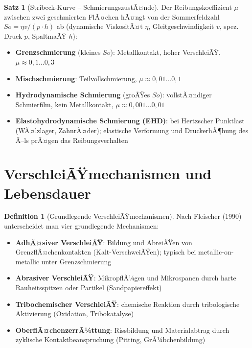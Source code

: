﻿\documentclass[a4paper,12pt]{report}
\theoremstyle{definition}
\newtheorem{definition}{Definition}
\newtheorem{satz}{Satz}
\begin{document}
\begin{satz}[Stribeck-Kurve -- SchmierungszustÃ¤nde]
Der Reibungskoeffizient $\mu$ zwischen zwei geschmierten FlÃ¤chen
hÃ¤ngt von der Sommerfeldzahl $So = \eta v / (p \cdot h)$ ab
(dynamische ViskositÃ¤t $\eta$, Gleitgeschwindigkeit $v$, spez. Druck $p$, SpaltmaÃŸ $h$):
\begin{itemize}
    \item[-] \textbf{Grenzschmierung} (kleines $So$): Metallkontakt, hoher VerschleiÃŸ,
          $\mu \approx 0{,}1\ldots0{,}3$
    \item[-] \textbf{Mischschmierung}: Teilvollschmierung, $\mu \approx 0{,}01\ldots0{,}1$
    \item[-] \textbf{Hydrodynamische Schmierung} (groÃŸes $So$): vollstÃ¤ndiger Schmierfilm,
          kein Metallkontakt, $\mu \approx 0{,}001\ldots0{,}01$
    \item[-] \textbf{Elastohydrodynamische Schmierung (EHD)}: bei Hertzscher Punktlast
          (WÃ¤lzlager, ZahnrÃ¤der); elastische Verformung und DruckerhÃ¶hung
          des Ã–ls prÃ¤gen das Reibungsverhalten
\end{itemize}
\end{satz}

\section{VerschleiÃŸmechanismen und Lebensdauer}

\begin{definition}[Grundlegende VerschleiÃŸmechanismen]
Nach Fleischer (1990) unterscheidet man vier grundlegende Mechanismen:
\begin{itemize}
    \item[-] \textbf{AdhÃ¤siver VerschleiÃŸ}: Bildung und AbreiÃŸen von
          GrenzflÃ¤chenkontakten (Kalt-VerschweiÃŸen); typisch bei
          metallic-on-metallic unter Grenzschmierung
    \item[-] \textbf{Abrasiver VerschleiÃŸ}: MikropflÃ¼gen und Mikrospanen
          durch harte Rauheitsspitzen oder Partikel (Sandpapiereffekt)
    \item[-] \textbf{Tribochemischer VerschleiÃŸ}: chemische Reaktion
          durch tribologische Aktivierung (Oxidation, Tribokatalyse)
    \item[-] \textbf{OberflÃ¤chenzerrÃ¼ttung}: Rissbildung und Materialabtrag
          durch zyklische Kontaktbeanspruchung (Pitting, GrÃ¼bchenbildung)
\end{itemize}
\end{definition}
\end{document}
